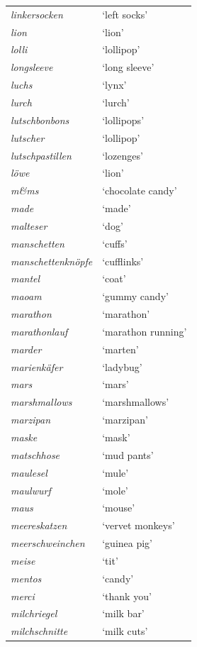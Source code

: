 \begin{longtable}{ll}
\textit{linkersocken} & `left socks' \\
\textit{lion} & `lion' \\
\textit{lolli} & `lollipop' \\
\textit{longsleeve} & `long sleeve' \\
\textit{luchs} & `lynx' \\
\textit{lurch} & `lurch' \\
\textit{lutschbonbons} & `lollipops' \\
\textit{lutscher} & `lollipop' \\
\textit{lutschpastillen} & `lozenges' \\
\textit{löwe} & `lion' \\
\textit{m\&ms} & `chocolate candy' \\
\textit{made} & `made' \\
\textit{malteser} & `dog' \\
\textit{manschetten} & `cuffs' \\
\textit{manschettenknöpfe} & `cufflinks' \\
\textit{mantel} & `coat' \\
\textit{maoam} & `gummy candy' \\
\textit{marathon} & `marathon' \\
\textit{marathonlauf} & `marathon running' \\
\textit{marder} & `marten' \\
\textit{marienkäfer} & `ladybug' \\
\textit{mars} & `mars' \\
\textit{marshmallows} & `marshmallows' \\
\textit{marzipan} & `marzipan' \\
\textit{maske} & `mask' \\
\textit{matschhose} & `mud pants' \\
\textit{maulesel} & `mule' \\
\textit{maulwurf} & `mole' \\
\textit{maus} & `mouse' \\
\textit{meereskatzen} & `vervet monkeys' \\
\textit{meerschweinchen} & `guinea pig' \\
\textit{meise} & `tit' \\
\textit{mentos} & `candy' \\
\textit{merci} & `thank you' \\
\textit{milchriegel} & `milk bar' \\
\textit{milchschnitte} & `milk cuts' \\

\end{longtable}
